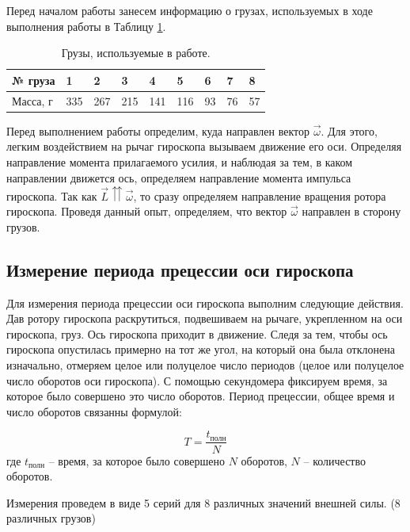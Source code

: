 \documentclass[12pt,a4paper]{article}
\begin{document}
Перед началом работы занесем информацию о грузах, используемых в ходе выполнения работы в Таблицу \ref{tab:load_mass}.

\begin{table}[h!]
	\begin{center}
		\begin{tabular}{|l|l|l|l|l|l|l|l|l|}
			\hline
			№ груза  & 1   & 2   & 3   & 4   & 5   & 6   & 7  & 8  \\ \hline
			Масса, г & 335 & 267 & 215 & 141 & 116 & 93 & 76 & 57 \\ \hline
		\end{tabular}
		\caption{Грузы, используемые в работе.}
		\label{tab:load_mass}
	\end{center}
\end{table}

Перед выполнением работы определим, куда направлен вектор $\vec{\omega}$. Для этого, легким воздействием на рычаг гироскопа вызываем движение его оси. Определяя направление момента прилагаемого усилия, и наблюдая за тем, в каком направлении движется ось, определяем направление момента импульса гироскопа. Так как $\vec{L}\upuparrows \vec{\omega}$, то сразу определяем направление вращения ротора гироскопа. Проведя данный опыт, определяем, что вектор $\vec{\omega}$ направлен в сторону грузов.

\subsection{Измерение периода прецессии оси гироскопа}

	Для измерения периода прецессии оси гироскопа выполним следующие действия. Дав ротору гироскопа раскрутиться, подвешиваем на рычаге, укрепленном на оси гироскопа, груз. Ось гироскопа приходит в движение. Следя за тем, чтобы ось гироскопа опустилась примерно на тот же угол, на который она была отклонена изначально, отмеряем целое или полуцелое число периодов (целое или полуцелое число оборотов оси гироскопа). С помощью секундомера фиксируем время, за которое было совершено это число оборотов. Период прецессии, общее время и число оборотов связанны формулой:
	
	\begin{equation}
		T = \frac{t_{\text{полн}}}{N}
		\label{eq:period_equation}
	\end{equation}
где $t_{\text{полн}}$ -- время, за которое было совершено $N$ оборотов, $N$ -- количество оборотов.

Измерения проведем в виде 5 серий для 8 различных значений внешней силы. (8 различных грузов)
\end{document}
